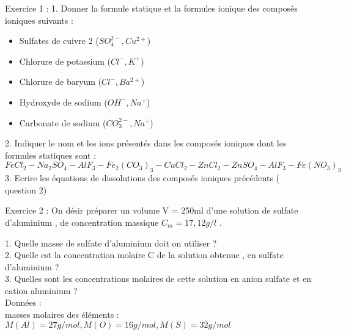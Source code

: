 \documentclass[12pt, french]{article}
\begin{document}
\begin{center}
\end{center}


   \begin{Box2}{Exercice 1 : }
      1. Donner la formule statique et la formules ionique des composés ioniques suivants :
      \begin{itemize}
         \item  Sulfates de cuivre 2 ($SO_4^{2-}, Cu^{2+}$)
         \item  Chlorure de potassium ($Cl^-,K^+$)
         \item  Chlorure de baryum ($Cl^-, Ba^{2+}$)
         \item  Hydroxyde de sodium ($OH^-, Na^+$)
         \item  Carbonate de sodium ($CO_3^{2-}, Na^+$)
      \end{itemize}
      2. Indiquer le nom et les ions présentés dans les composés ioniques dont les formules statiques sont  : $FeCl_2 - Na_2SO_4 - AlF_3 - Fe_2(CO_3)_3 - CuCl_2 - ZnCl_2 - ZnSO_4 - AlF_3 - Fe(NO_3)_3 $
      \\
 3. Ecrire les équations de dissolutions des composés ioniques précédents ( question 2)

   \end{Box2}


\begin{Box2}{Exercice 2 : }
On désir préparer un volume V = 250ml d’une solution de sulfate d’aluminium , de concentration massique $C_m = 17, 12g/l$ .

1. Quelle masse de sulfate d’aluminium doit on utiliser ?\\
2. Quelle est la concentration molaire C de la solution obtenue , en sulfate d’aluminium ?\\
3. Quelles sont les concentrations molaires de cette solution en anion sulfate et en cation
aluminium ?\\
Données :\\
masses molaires des éléments :$ M(Al) = 27g/mol , M(O) = 16g/mol , M(S) = 32g/mol$
\end{Box2}
\end{document}
